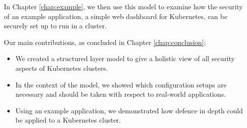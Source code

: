 In Chapter \ref{chap:example}, we then use this model to examine how the security of an example application, a simple web dashboard for Kubernetes, can be securely set up to run in a cluster. 

Our main contributions, as concluded in Chapter \ref{chap:conclusion}:

\begin{itemize}
	\item We created a structured layer model to give a holistic view of all security aspects of Kubernetes clusters.
	\item In the context of the model, we showed which configuration setups are necessary and should be taken with respect to real-world applications.
	\item Using an example application, we demonstrated how defence in depth could be applied to a Kubernetes cluster.
\end{itemize}



